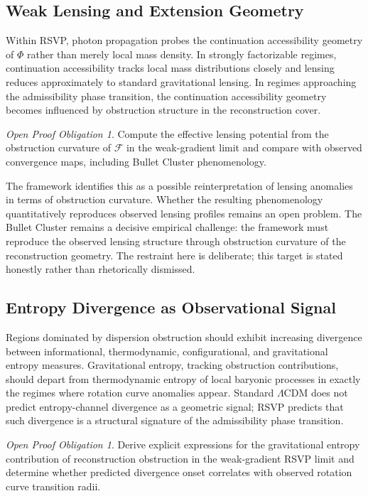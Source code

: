 \documentclass[11pt, a4paper]{article}
\theoremstyle{plain}
\theoremstyle{definition}
\theoremstyle{remark}
\newtheorem{obligation}[theorem]{Open Proof Obligation}
\newcommand{\sheaf}{\mathcal{F}}
\begin{document}
\subsection{Weak Lensing and Extension Geometry}

Within RSVP, photon propagation probes the continuation accessibility geometry of
$\Phi$ rather than merely local mass density. In strongly factorizable regimes,
continuation accessibility tracks local mass distributions closely and lensing
reduces approximately to standard gravitational lensing. In regimes approaching the
admissibility phase transition, the continuation accessibility geometry becomes
influenced by obstruction structure in the reconstruction cover.

\begin{obligation}
\label{obl:lensing}
Compute the effective lensing potential from the obstruction curvature of $\sheaf$
in the weak-gradient limit and compare with observed convergence maps, including
Bullet Cluster phenomenology.
\end{obligation}

The framework identifies this as a possible reinterpretation of lensing anomalies in
terms of obstruction curvature. Whether the resulting phenomenology quantitatively
reproduces observed lensing profiles remains an open problem. The Bullet Cluster
remains a decisive empirical challenge: the framework must reproduce the observed
lensing structure through obstruction curvature of the reconstruction geometry. The
restraint here is deliberate; this target is stated honestly rather than
rhetorically dismissed.

\subsection{Entropy Divergence as Observational Signal}

Regions dominated by dispersion obstruction should exhibit increasing divergence
between informational, thermodynamic, configurational, and gravitational entropy
measures. Gravitational entropy, tracking obstruction contributions, should depart
from thermodynamic entropy of local baryonic processes in exactly the regimes where
rotation curve anomalies appear. Standard $\Lambda$CDM does not predict
entropy-channel divergence as a geometric signal; RSVP predicts that such divergence
is a structural signature of the admissibility phase transition.

\begin{obligation}
\label{obl:entropy-signal}
Derive explicit expressions for the gravitational entropy contribution of
reconstruction obstruction in the weak-gradient RSVP limit and determine whether
predicted divergence onset correlates with observed rotation curve transition radii.
\end{obligation}
\end{document}
